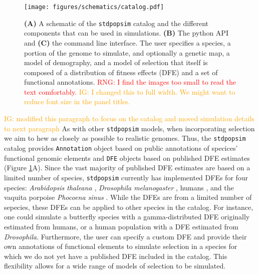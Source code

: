 \documentclass[hidelinks]{article}
\newcommand{\stdpopsim}{\texttt{stdpopsim}\xspace}
\newcommand{\rngcomment}[1]{\textcolor{red}{RNG: #1}}
\newcommand{\igcomment}[1]{\textcolor{orange}{IG: #1}}
\begin{document}
    \begin{figure}[t!]
        \texttt{[image: figures/schematics/catalog.pdf]}
        \caption{\label{fig:schematic}
        \textbf{(A)} A schematic of the \stdpopsim catalog and the different components that
        can be used in simulations. 
        \textbf{(B)} The python API and \textbf{(C)} the command line interface.
        The user specifies a species, a portion of
        the genome to simulate, and optionally a genetic map, a model of
        demography, and a model of selection that itself is composed of a
        distribution of fitness effects (DFE) and a set of functional
        annotations. \rngcomment{I find the images too small to read the text comfortably.}
        \igcomment{I changed this to full width. We might want to reduce font size in the panel titles.}}
    \end{figure}
    
    \igcomment{modified this paragraph to focus on the catalog and moved simulation details to next paragraph}
    As with other \stdpopsim models, when incorporating selection we aim to hew as closely as possible
    to realistic genomes.
    Thus, the \stdpopsim catalog provides \texttt{Annotation} object based on public annotations
    of specices' functional genomic elements 
    and \texttt{DFE} objects based on published DFE estimates (Figure \ref{fig:schematic}A).
    Since the vast majority of published DFE estimates are based on a limited number of species,
    \stdpopsim currently has implemented DFEs for four species:
    \textit{Arabidopsis thaleana} \citep{huber2018gene}, \textit{Drosophila melanogaster} \citep{ragsdale2016triallelic,huber2017determining},
    humans \citep{huber2017determining,kim2017inference}, and the vaquita porpoise \textit{Phocoena sinus} \citep{robinson2022critically}.
    While the DFEs are from a limited number of sepecies, these DFEs can be applied to other species
    in the catalog. For instance, one could simulate a butterfly species with a gamma-distributed DFE originally
    estimated from humans, or a human population with a DFE estimated from \textit{Drosophila}.
    Furthermore, the user can specify a custom DFE and provide their own annotations
    of functional elements to simulate selection in a species for which we do not yet have 
    a published DFE included in the catalog. This flexibility allows for a wide range of
    models of selection to be simulated. %
   
\end{document}
